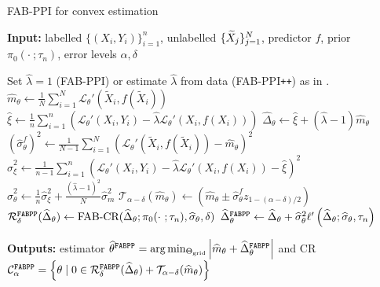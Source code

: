 \begin{algorithm}
    \caption{FAB-PPI for convex estimation}
    \label{algo:FABPPIConvex}
    {\bfseries Input:} labelled $\{(X_i,Y_i)\}_{i=1}^n$, unlabelled $\{\widetilde X_j\}_{j=1}^N$, predictor $f$, prior $\pi_0(\cdot~; \tau_n)$, error levels $\alpha,\delta$
    \begin{algorithmic}
        \STATE Set $\widehat\lambda=1$ (FAB-PPI) or estimate $\widehat\lambda$ from data (FAB-PPI\texttt{++}) as in \citet{Angelopoulos2023a}.
            \STATE $\widehat m_\theta \gets \frac{1}{N}\sum_{i=1}^{N} \mathcal{L}_{\theta}'(\widetilde X_i,f(\widetilde X_i))$
            \STATE $\widehat{\xi} \gets \frac{1}{n}\sum_{i=1}^n \left(\mathcal{L}_{\theta}'(X_i,Y_i)- \widehat{\lambda} \mathcal{L}_{\theta}'(X_i,f(X_i))\right)$
            \STATE $\widehat \Delta_\theta \gets \widehat{\xi} + (\widehat \lambda -1 ) \widehat m_\theta$
            \STATE $(\widehat{\sigma}^f_\theta)^2 \gets \frac{1}{N - 1} \sum_{i=1}^{N} \left(\mathcal{L}_{\theta}'(\widetilde X_i,f(\widetilde X_i)) - \widehat m_\theta\right)^2$
            \STATE $\widehat \sigma_\xi^2 \gets \frac{1}{n-1} \sum_{i=1}^n \left(\mathcal{L}_{\theta}'(X_i,Y_i)- \widehat{\lambda} \mathcal{L}_{\theta}'(X_i,f(X_i)) - \widehat{\xi}\right)^2$
            \STATE $\widehat{\sigma}^2_\theta \gets \frac{1}{n} \widehat \sigma_\xi^2 + \frac{(\widehat \lambda -1 )^2}{N} \widehat{\sigma}^2_m$
            \STATE $\mathcal{T}_{\alpha - \delta}(\widehat m_\theta) \gets \left(\widehat{m}_\theta \pm \widehat{\sigma}^f_\theta z_{1-(\alpha - \delta)/2}\right)$
            \STATE $\mathcal R^{\mathrm{\texttt{FABPP}}}_\delta(\widehat\Delta_\theta)\gets \text{FAB-CR}(\widehat\Delta_\theta;\pi_0(\cdot~;\tau_n),\widehat\sigma_\theta,\delta)$
            \STATE $\widehat\Delta_\theta^{\mathrm{\texttt{FABPP}}} \gets \widehat\Delta_\theta + \widehat\sigma_\theta^2 \ell'\left(\widehat\Delta_\theta;\widehat\sigma_\theta, \tau_n\right)$
        \ENDFOR
    \end{algorithmic}
    {\bfseries Outputs:} estimator $\widehat \theta^{\mathrm{\texttt{FABPP}}} = \arg\min_{\Theta_\text{grid}} \left|\widehat{m}_\theta + \widehat\Delta_\theta^{\mathrm{\texttt{FABPP}}}\right|$ and CR $\mathcal C_\alpha^{\mathrm{\texttt{FABPP}}}=\left\{\theta \mid 0\in \mathcal R^{\mathrm{\texttt{FABPP}}}_\delta(\widehat\Delta_\theta) + \mathcal T_{\alpha-\delta}(\widehat m_\theta)\right\}$
\end{algorithm}

